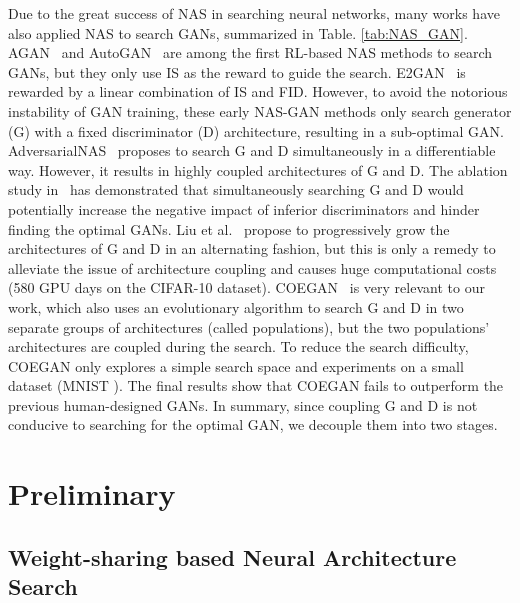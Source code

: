 \documentclass[runningheads]{llncs}
\begin{document}
Due to the great success of NAS in searching neural networks, many works have also applied NAS to search GANs, summarized in Table. \ref{tab:NAS_GAN}. AGAN~\cite{agan} and AutoGAN~\cite{autoGAN} are among the first RL-based NAS methods to search GANs, but they only use IS as the reward to guide the search. E2GAN~\cite{offgan} is rewarded by a linear combination of IS and FID. However, to avoid the notorious instability of GAN training, these early NAS-GAN methods only search generator (G) with a fixed discriminator (D) architecture, resulting in a sub-optimal GAN. AdversarialNAS~\cite{Adversarialnas} proposes to search G and D simultaneously in a differentiable way. However, it results in highly coupled architectures of G and D. The ablation study in~\cite{AlphaGAN} has demonstrated that simultaneously searching G and D would potentially increase the negative impact of inferior discriminators and hinder finding the optimal GANs. Liu et al.~\cite{dggan} propose to progressively grow the architectures of G and D in an alternating fashion, but this is only a remedy to alleviate the issue of architecture coupling and causes huge computational costs (580 GPU days on the CIFAR-10 \cite{cifar10} dataset).  COEGAN~\cite{costa2019coevolution} is very relevant to our work, which also uses an evolutionary algorithm to search G and D in two separate groups of architectures (called populations), but the two populations' architectures are coupled during the search. To reduce the search difficulty, COEGAN only explores a simple search space and experiments on a small dataset (MNIST \cite{mnist}). The final results show that COEGAN fails to outperform the previous human-designed GANs. In summary, since coupling G and D is not conducive to searching for the optimal GAN, we decouple them into two stages.







\section{Preliminary}

\subsection{Weight-sharing based Neural Architecture Search}
\end{document}
